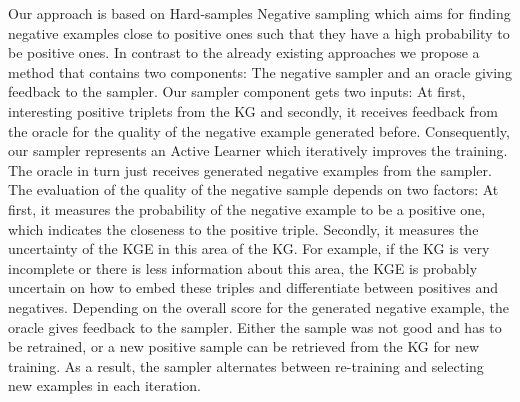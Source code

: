 Our approach is based on Hard-samples Negative sampling which aims for finding negative examples close to positive ones such that they have a high probability to be positive ones.
In contrast to the already existing approaches we propose a method that contains two components:
The negative sampler and an oracle giving feedback to the sampler.
Our sampler component gets two inputs:
At first, interesting positive triplets from the \ac{KG} and secondly, it receives feedback from the oracle for the quality of the negative example generated before.
Consequently, our sampler represents an Active Learner which iteratively improves the training.
The oracle in turn just receives generated negative examples from the sampler. 
The evaluation of the quality of the negative sample depends on two factors:
At first, it measures the probability of the negative example to be a positive one, 
which indicates the closeness to the positive triple. 
Secondly, it measures the uncertainty of the \ac{KGE} in this area of the \ac{KG}. 
For example, if the \ac{KG} is very incomplete or there is less information about this area, the \ac{KGE} is probably uncertain on how to embed these triples and differentiate between positives and negatives.
Depending on the overall score for the generated negative example, the oracle gives feedback to the sampler.
Either the sample was not good and has to be retrained, or a new positive sample can be retrieved from the \ac{KG} for new training.
As a result, the sampler alternates between re-training and selecting new examples in each iteration.

